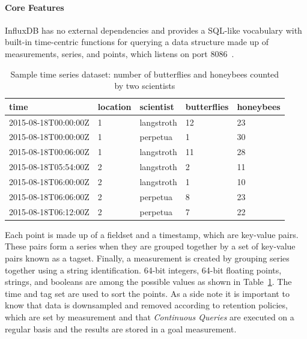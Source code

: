 \paragraph{Core Features}
InfluxDB has no external dependencies and provides a SQL-like vocabulary with built-in time-centric functions for querying a data structure made up of measurements, series, and points, which listens on port 8086~\cite{Misc:influx_docs}.

\begin{table}[ht]
    \centering
    \begin{tabular}{|l|l|l|l|l|}
        \toprule
        time                 & location & scientist  & butterflies & honeybees \\ \midrule
        2015-08-18T00:00:00Z & 1        & langstroth & 12          & 23        \\ \hline
        2015-08-18T00:00:00Z & 1        & perpetua   & 1           & 30        \\ \hline
        2015-08-18T00:06:00Z & 1        & langstroth & 11          & 28        \\ \hline
        2015-08-18T05:54:00Z & 2        & langstroth & 2           & 11        \\ \hline
        2015-08-18T06:00:00Z & 2        & langstroth & 1           & 10        \\ \hline
        2015-08-18T06:06:00Z & 2        & perpetua   & 8           & 23        \\ \hline
        2015-08-18T06:12:00Z & 2        & perpetua   & 7           & 22        \\ \bottomrule
    \end{tabular}
    \caption{Sample time series dataset: number of butterflies and honeybees counted by two scientists}\label{tab:influx_example}
\end{table}

Each point is made up of a fieldset and a timestamp, which are key-value pairs. These pairs form a series when they are grouped together by a set of key-value pairs known as a tagset. Finally, a measurement is created by grouping series together using a string identification.
64-bit integers, 64-bit floating points, strings, and booleans are among the possible values as shown in Table~\ref{tab:influx_example}. The time and tag set are used to sort the points.
As a side note it is important to know that data is downsampled and removed according to retention policies, which are set by measurement and that \textit{Continuous Queries} are executed on a regular basis and the results are stored in a goal measurement.

